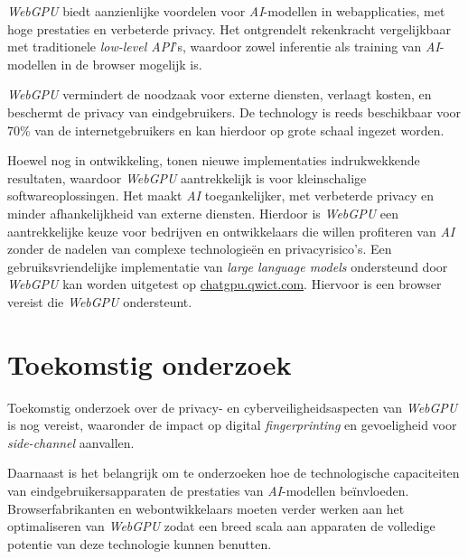 \documentclass[a0,portrait]{hogent-poster}
\begin{document}
\begin{multicols}{2}
\textit{WebGPU} biedt aanzienlijke voordelen voor \textit{AI}-modellen in webapplicaties, met hoge prestaties en verbeterde privacy. Het ontgrendelt rekenkracht vergelijkbaar met traditionele \textit{low-level API}'s, waardoor zowel inferentie als training van \textit{AI}-modellen in de browser mogelijk is.

\textit{WebGPU} vermindert de noodzaak voor externe diensten, verlaagt kosten, en beschermt de privacy van eindgebruikers. De technology is reeds beschikbaar voor 70\% van de internetgebruikers en kan hierdoor op grote schaal ingezet worden.

Hoewel nog in ontwikkeling, tonen nieuwe implementaties indrukwekkende resultaten, waardoor \textit{WebGPU} aantrekkelijk is voor kleinschalige softwareoplossingen. Het maakt \textit{AI} toegankelijker, met verbeterde privacy en minder afhankelijkheid van externe diensten. Hierdoor is \textit{WebGPU} een aantrekkelijke keuze voor bedrijven en ontwikkelaars die willen profiteren van \textit{AI} zonder de nadelen van complexe technologieën en privacyrisico's. Een gebruiksvriendelijke implementatie van \textit{large language models} ondersteund door \textit{WebGPU} kan worden uitgetest op \href{https://chatgpu.qwict.com}{chatgpu.qwict.com}. Hiervoor is een browser vereist die \textit{WebGPU} ondersteunt.

\section{Toekomstig onderzoek}

Toekomstig onderzoek over de privacy- en cyberveiligheidsaspecten van \textit{WebGPU} is nog vereist, waaronder de impact op digital \textit{fingerprinting} en gevoeligheid voor \textit{side-channel} aanvallen.

Daarnaast is het belangrijk om te onderzoeken hoe de technologische capaciteiten van eindgebruikersapparaten de prestaties van \textit{AI}-modellen beïnvloeden. Browserfabrikanten en webontwikkelaars moeten verder werken aan het optimaliseren van \textit{WebGPU} zodat een breed scala aan apparaten de volledige potentie van deze technologie kunnen benutten.

\end{multicols}
\end{document}
